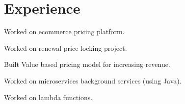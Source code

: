 \documentclass[letterpaper]{deedy-resume} %
\begin{document}
\begin{minipage}[t]{0.66\textwidth} %


\section{Experience}
\sectionspace


\vspace{\topsep} %
\begin{tightitemize}
\item Worked on ecommerce pricing platform.
\item Worked on renewal price locking project.
\item Built Value based pricing model for increasing revenue.
\item Worked on microservices background services (using Java).
\item Worked on lambda functions.
\end{tightitemize}
\sectionspace %
\sectionspace




\end{minipage}
\end{document}

